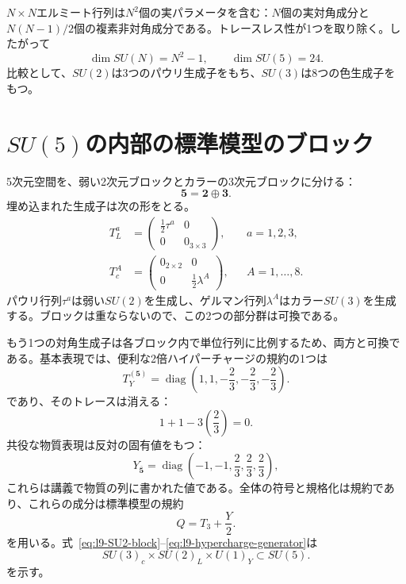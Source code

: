 \(N\times N\)エルミート行列は\(N^2\)個の実パラメータを含む：\(N\)個の実対角成分と\(N(N-1)/2\)個の複素非対角成分である。トレースレス性が1つを取り除く。したがって
\begin{equation}
\dim SU(N)=N^2-1,
\qquad
\dim SU(5)=24.
\label{eq:l9-SU5-dimension}
\end{equation}
比較として、\(SU(2)\)は3つのパウリ生成子をもち、\(SU(3)\)は8つの色生成子をもつ。

\section{\texorpdfstring{\(SU(5)\)}{SU(5)}の内部の標準模型のブロック}

5次元空間を、弱い2次元ブロックとカラーの3次元ブロックに分ける：
\begin{equation}
\mathbf5=\mathbf2\oplus\mathbf3.
\end{equation}
埋め込まれた生成子は次の形をとる。
\begin{align}
T^a_L
&=
\begin{pmatrix}
\tfrac12\tau^a&0\\
0&0_{3\times3}
\end{pmatrix},
&& a=1,2,3,
\label{eq:l9-SU2-block}\\
T^A_c
&=
\begin{pmatrix}
0_{2\times2}&0\\
0&\tfrac12\lambda^A
\end{pmatrix},
&& A=1,\ldots,8.
\label{eq:l9-SU3-block}
\end{align}
パウリ行列\(\tau^a\)は弱い\(SU(2)\)を生成し、ゲルマン行列\(\lambda^A\)はカラー\(SU(3)\)を生成する。ブロックは重ならないので、この2つの部分群は可換である。

もう1つの対角生成子は各ブロック内で単位行列に比例するため、両方と可換である。基本表現では、便利な2倍ハイパーチャージの規約の1つは
\begin{equation}
T_Y^{(\mathbf5)}=
\operatorname{diag}
\left(
1,1,-\frac23,-\frac23,-\frac23
\right).
\label{eq:l9-hypercharge-generator}
\end{equation}
であり、そのトレースは消える：
\begin{equation}
1+1-3\left(\frac23\right)=0.
\end{equation}
共役な物質表現は反対の固有値をもつ：
\begin{equation}
Y_{\overline{\mathbf5}}
=
\operatorname{diag}
\left(
-1,-1,\frac23,\frac23,\frac23
\right),
\label{eq:l9-fivebar-hypercharge}
\end{equation}
これらは講義で物質の列に書かれた値である。全体の符号と規格化は規約であり、これらの成分は標準模型の規約
\begin{equation}
Q=T_3+\frac{Y}{2}.
\label{eq:l9-charge}
\end{equation}
を用いる。式~\eqref{eq:l9-SU2-block}--\eqref{eq:l9-hypercharge-generator}は
\begin{equation}
SU(3)_c\times SU(2)_L\times U(1)_Y
\subset SU(5).
\end{equation}
を示す。

